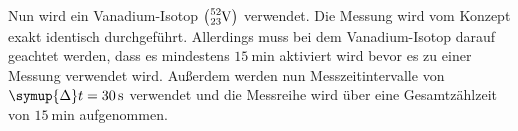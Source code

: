 Nun wird ein Vanadium-Isotop $\left(\ce{^{52}_{23}V}\right)$ verwendet. Die Messung wird vom Konzept exakt identisch durchgeführt. Allerdings muss bei dem Vanadium-Isotop
darauf geachtet werden, dass es mindestens $\qty{15}{\minute}$ aktiviert wird bevor es zu einer Messung verwendet wird. Außerdem werden nun Messzeitintervalle von 
$\symup{\Delta}t = \qty{30}{\second}$ verwendet und die Messreihe wird über eine Gesamtzählzeit von $\qty{15}{\minute}$ aufgenommen.
